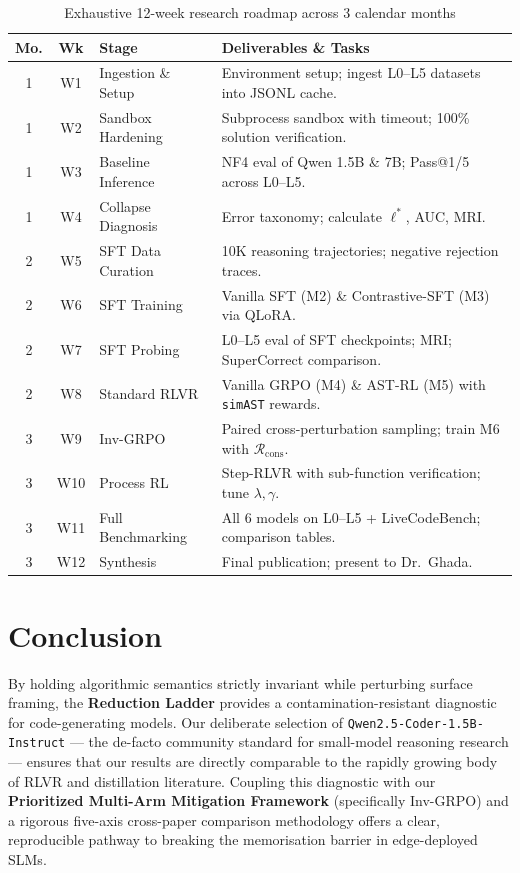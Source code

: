 \documentclass[12pt, a4paper]{article}
\begin{document}
\begin{table}[ht!]
\centering
\caption{Exhaustive 12-week research roadmap across 3 calendar months}
\label{tab:detailed_timeline}
\renewcommand{\arraystretch}{1.2}
{\footnotesize
\begin{tabularx}{\textwidth}{c c l X}
\toprule
\textbf{Mo.} & \textbf{Wk} & \textbf{Stage} & \textbf{Deliverables \& Tasks} \\
\midrule
1 & W1 & Ingestion \& Setup & Environment setup; ingest L0--L5 datasets into JSONL cache. \\
1 & W2 & Sandbox Hardening & Subprocess sandbox with timeout; 100\% solution verification. \\
1 & W3 & Baseline Inference & NF4 eval of Qwen 1.5B \& 7B; Pass@1/5 across L0--L5. \\
1 & W4 & Collapse Diagnosis & Error taxonomy; calculate $\ell^*$, AUC, MRI. \\
\midrule
2 & W5 & SFT Data Curation & 10K reasoning trajectories; negative rejection traces. \\
2 & W6 & SFT Training & Vanilla SFT (M2) \& Contrastive-SFT (M3) via QLoRA. \\
2 & W7 & SFT Probing & L0--L5 eval of SFT checkpoints; MRI; SuperCorrect comparison. \\
2 & W8 & Standard RLVR & Vanilla GRPO (M4) \& AST-RL (M5) with \texttt{simAST} rewards. \\
\midrule
3 & W9 & Inv-GRPO & Paired cross-perturbation sampling; train M6 with $\mathcal{R}_{\text{cons}}$. \\
3 & W10 & Process RL & Step-RLVR with sub-function verification; tune $\lambda, \gamma$. \\
3 & W11 & Full Benchmarking & All 6 models on L0--L5 + LiveCodeBench; comparison tables. \\
3 & W12 & Synthesis & Final publication; present to Dr.\ Ghada. \\
\bottomrule
\end{tabularx}
}
\end{table}

\section{Conclusion}

By holding algorithmic semantics strictly invariant while perturbing surface framing, the \textbf{Reduction Ladder} provides a contamination-resistant diagnostic for code-generating models. Our deliberate selection of \texttt{Qwen2.5-Coder-1.5B-Instruct} --- the de-facto community standard for small-model reasoning research --- ensures that our results are directly comparable to the rapidly growing body of RLVR and distillation literature. Coupling this diagnostic with our \textbf{Prioritized Multi-Arm Mitigation Framework} (specifically Inv-GRPO) and a rigorous five-axis cross-paper comparison methodology offers a clear, reproducible pathway to breaking the memorisation barrier in edge-deployed SLMs.

\newpage
\printbibliography[heading=bibintoc, title={References}]
\end{document}
